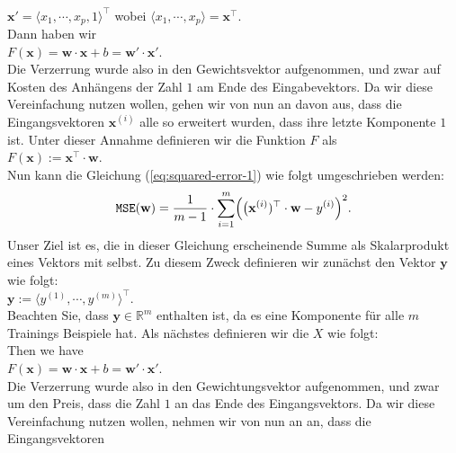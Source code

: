 \documentclass[12pt]{article}
\begin{document}
\\[0.2cm]
\hspace*{1.3cm}
$\mathbf{x}' = \langle x_1, \cdots, x_p, 1 \rangle^\top$ \quad wobei $\langle x_1, \cdots, x_p \rangle = \mathbf{x}^\top$.
\\[0.2cm]
Dann haben wir
\\[0.2cm]
\hspace*{1.3cm}
$ F(\mathbf{x}) = \mathbf{w} \cdot \mathbf{x} + b = \mathbf{w}' \cdot \mathbf{x}'$.
\\[0.2cm]
Die Verzerrung wurde also in den Gewichtsvektor aufgenommen, und zwar auf Kosten des Anhängens der Zahl $1$ am Ende des
Eingabevektors.  Da wir diese Vereinfachung nutzen wollen, gehen wir von nun an davon aus, dass die Eingangsvektoren
$\mathbf{x}^{(i)}$ alle so erweitert wurden, dass ihre letzte Komponente $1$ ist.  Unter dieser
Annahme definieren wir die
Funktion $F$ als
\\[0.2cm]
\hspace*{1.3cm}
$F(\mathbf{x}) := \mathbf{x}^\top \cdot \mathbf{w}$.
\\[0.2cm]
Nun kann die Gleichung (\ref{eq:squared-error-1}) wie folgt umgeschrieben werden:
\begin{equation}
  \label{eq:squared-error-2}
  \mathtt{MSE}(\mathbf{w}) = \frac{1}{m-1} \cdot \sum\limits_{i=1}^m \Bigl(\bigl(\mathbf{x}^{(i)})^\top \cdot \mathbf{w} - y^{(i)}\Bigr)^2.
\end{equation}
Unser Ziel ist es, die in dieser Gleichung erscheinende Summe als Skalarprodukt eines Vektors mit
selbst.  Zu diesem Zweck definieren wir zunächst den Vektor $\mathbf{y}$ wie folgt:
\\
\hspace*{1.3cm}
$\mathbf{y} := \langle y^{(1)}, \cdots, y^{(m)} \rangle^\top$.
\\[0.2cm]
Beachten Sie, dass $\mathbf{y} \in \mathbb{R}^m$ enthalten ist, da es eine Komponente für alle $m$ Trainings
Beispiele hat.  Als nächstes definieren wir die {\color{blue}{Designmatrix}} $X$ wie folgt:
\\[0.2cm]
Then we have
\\[0.2cm]
\hspace*{1.3cm}
$ F(\mathbf{x}) = \mathbf{w} \cdot \mathbf{x} + b = \mathbf{w}' \cdot \mathbf{x}'$.
\\[0.2cm]
Die Verzerrung wurde also in den Gewichtungsvektor aufgenommen, und zwar um den Preis, dass die Zahl $1$ an das Ende des
Eingangsvektors.  Da wir diese Vereinfachung nutzen wollen, nehmen wir von nun an an, dass die Eingangsvektoren
\end{document}
